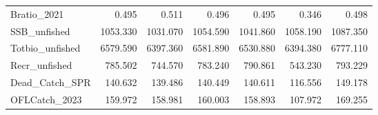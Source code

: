 \documentclass[
  english,
  a4paper,
]{article}
\begin{document}
\begin{table}
{\begin{tabular}[t]{lrrrrrr}
Bratio\_2021 & 0.495 & 0.511 & 0.496 & 0.495 & 0.346 & 0.498\\
SSB\_unfished & 1053.330 & 1031.070 & 1054.590 & 1041.860 & 1058.190 & 1087.350\\
Totbio\_unfished & 6579.590 & 6397.360 & 6581.890 & 6530.880 & 6394.380 & 6777.110\\
Recr\_unfished & 785.502 & 744.570 & 783.240 & 790.861 & 543.230 & 793.229\\
Dead\_Catch\_SPR & 140.632 & 139.486 & 140.449 & 140.611 & 116.556 & 149.178\\
OFLCatch\_2023 & 159.972 & 158.981 & 160.003 & 158.893 & 107.972 & 169.255\\
\bottomrule
\end{tabular}}
\end{table}

\begin{table}


\end{table}
\end{document}
